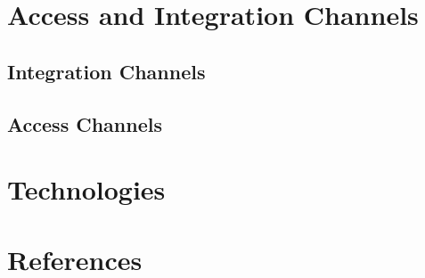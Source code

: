 \documentclass[a4paper,12pt]{article}
\begin{document}

	\section{Access and Integration Channels}
		\subsection{Integration Channels}
		
		
		\subsection{Access Channels}
		

	\section{Technologies}
	
	
	
	\section{References}
	
	
\end{document}
